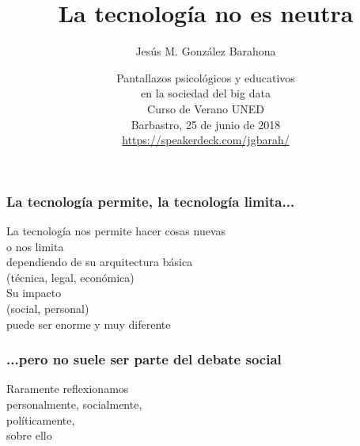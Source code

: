 \documentclass[17pt,aspectratio=169]{beamer}
\begin{document}
\title{La tecnología no es neutra}
\author{Jesús M. González Barahona}

\date{Pantallazos psicológicos y educativos \\
  en la sociedad del big data \\
  Curso de Verano UNED \\
  Barbastro, 25 de junio de 2018\\
{\small \url{https://speakerdeck.com/jgbarah/}} \\}

\frame{
\maketitle
}





\begin{frame}
\frametitle{La tecnología permite, la tecnología limita...}

\begin{flushright}
La tecnología nos permite hacer cosas nuevas \\
o nos limita \\
dependiendo de su arquitectura básica \\
(técnica, legal, económica) \\
\vspace{.5cm}
Su impacto \\
(social, personal) \\
puede ser enorme y muy diferente \\
\end{flushright}

\end{frame}


\begin{frame}
\frametitle{...pero no suele ser parte del debate social}

\begin{center}
{\Large
Raramente reflexionamos\\
personalmente, socialmente, \\
políticamente, \\
sobre ello \\
}
\end{center}

\end{frame}
\end{document}
